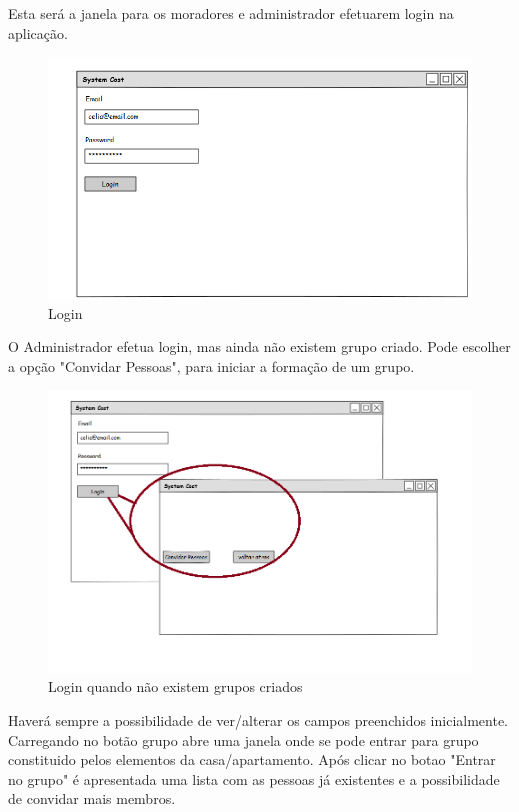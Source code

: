 Esta será a janela para os moradores e administrador efetuarem login na aplicação. 
\begin{figure}[htb!]
	\centering
	\includegraphics[scale=0.5]{imagens/mockups/MLogin}  
	\caption{Login}  
\end{figure}

\newpage
O Administrador efetua login, mas ainda não existem grupo criado. Pode escolher a opção "Convidar Pessoas", para iniciar a formação de um grupo. 
\begin{figure}[h!]
	\centering
	\includegraphics[scale=0.5]{imagens/mockups/loginsemgrupos}  
	\caption{Login quando não existem grupos criados }  
\end{figure}


Haverá sempre a possibilidade de ver/alterar os campos preenchidos inicialmente. 
Carregando no botão grupo abre uma janela onde se pode entrar para grupo constituido pelos elementos da casa/apartamento. Após clicar no botao "Entrar no grupo" é  apresentada uma lista com as pessoas já existentes e a possibilidade de convidar mais membros. 

